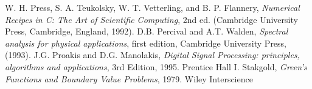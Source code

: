 \newpage
\newpage\begin{thebibliography}{0}
W. H. Press, S. A. Teukolsky, W. T. Vetterling, and B. P. Flannery,
  \textit{Numerical Recipes in C: The Art of Scientific Computing}, 2nd ed.
  (Cambridge University Press, Cambridge, England, 1992).
D.B. Percival and A.T. Walden, {\it Spectral analysis for physical applications}, first edition, Cambridge University Press, (1993).
J.G. Proakis and D.G. Manolakis, {\it Digital
Signal Processing: principles, algorithms and applications},
3rd Edition, 1995.
Prentice Hall
I. Stakgold, {\it Green's Functions and Boundary Value Problems},
1979.
Wiley Interscience
\end{thebibliography}
